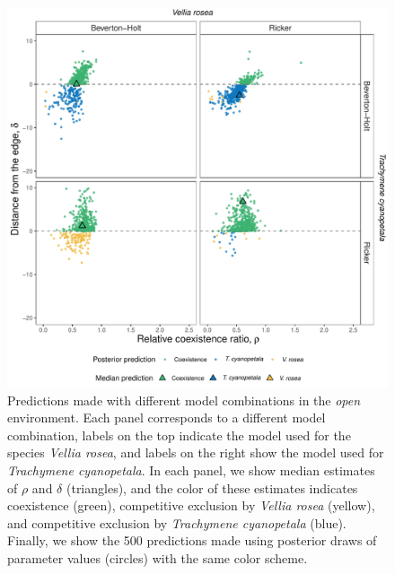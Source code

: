 \begin{refsection}
\begin{figure}[H]
  \centerline{\includegraphics[width=1\textwidth]{figures/chapter3_fig3}}
  \caption[Predictions made with different model combinations in the \textit{open} environment]{Predictions made with different model combinations in the \textit{open} environment. Each panel corresponds to a different model combination, labels on the top indicate the model used for the species \textit{Vellia rosea}, and labels on the right show  the model used for \textit{Trachymene cyanopetala}.  In each panel, we show median estimates of $\rho$ and $\delta$ (triangles), and the color of these estimates indicates coexistence (green), competitive exclusion by \textit{Vellia rosea} (yellow), and competitive exclusion by \textit{Trachymene cyanopetala} (blue). Finally, we show the 500 predictions made using posterior draws of parameter values (circles) with the same color scheme.  }
  \label{fig:open}
\end{figure}


\end{refsection}
